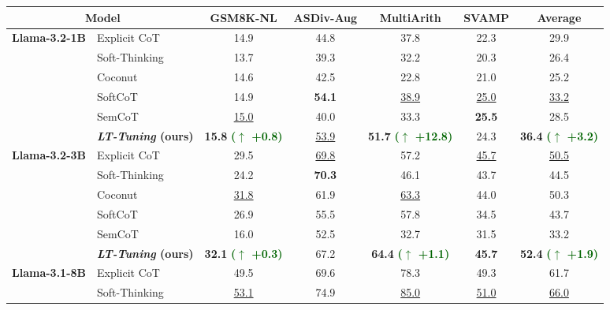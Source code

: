 \documentclass{article}
\newcommand{\increase}[1]{\textcolor{darkgreen}{($\uparrow$ +#1)}}
\theoremstyle{plain}
\theoremstyle{definition}
\theoremstyle{remark}
\begin{document}
\begin{table}[t]
\centering
\begin{adjustbox}{width=0.95\textwidth}
\begin{tabular}{llccccc}
\toprule
\multicolumn{2}{c}{\bf Model} & \bf GSM8K-NL & \bf ASDiv-Aug & \bf MultiArith & \bf SVAMP & \bf Average \\ 
\midrule
\multirow{6}{*}{\bf Llama-3.2-1B}
& Explicit CoT                      & 14.9 & 44.8 & 37.8 & 22.3 & 29.9 \\
& Soft-Thinking            & 13.7 & 39.3 & 32.2 & 20.3 & 26.4 \\
& Coconut                        & 14.6 & 42.5 & 22.8 & 21.0 & 25.2 \\
& SoftCoT                        & 14.9 & \textbf{54.1} & \underline{38.9} & \underline{25.0} & \underline{33.2} \\
& SemCoT                         & \underline{15.0} & 40.0 & 33.3 & \textbf{25.5} & 28.5 \\
\rowcolor{lightblue!20}
& \textbf{\textit{LT-Tuning} (ours)}            & \textbf{15.8} \textbf{\increase{0.8}} & \underline{53.9} & \textbf{51.7} \textbf{\increase{12.8}} & 24.3 & \textbf{36.4} \textbf{\increase{3.2}} \\
\midrule
\multirow{6}{*}{\bf Llama-3.2-3B}
& Explicit CoT                            & 29.5 & \underline{69.8} & 57.2 & \underline{45.7} & \underline{50.5} \\
& Soft-Thinking            & 24.2 & \textbf{70.3} & 46.1 & 43.7 & 44.5 \\
& Coconut                        & \underline{31.8} & 61.9 & \underline{63.3} & 44.0 & 50.3 \\
& SoftCoT                        & 26.9 & 55.5 & 57.8 & 34.5 & 43.7 \\
& SemCoT                         & 16.0 & 52.5 & 32.7 & 31.5 & 33.2 \\
\rowcolor{lightblue!20}
& \textbf{\textit{LT-Tuning} (ours)}            & \textbf{32.1} \textbf{\increase{0.3}} & 67.2 & \textbf{64.4} \textbf{\increase{1.1}} & \textbf{45.7} & \textbf{52.4} \textbf{\increase{1.9}} \\
\midrule
\multirow{6}{*}{\bf Llama-3.1-8B}
& Explicit CoT                            & 49.5 & 69.6 & 78.3 & 49.3 & 61.7 \\
& Soft-Thinking            & \underline{53.1} & 74.9 & \underline{85.0} & \underline{51.0} & \underline{66.0} \\

\end{tabular}
\end{adjustbox}
\end{table}
\end{document}
